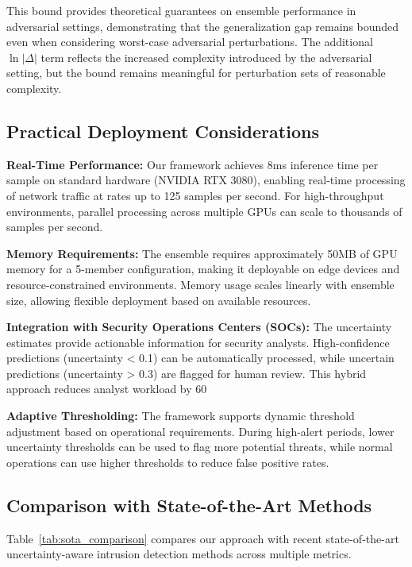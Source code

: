 \documentclass[journal]{IEEEtran}
\begin{document}
This bound provides theoretical guarantees on ensemble performance in adversarial settings, demonstrating that the generalization gap remains bounded even when considering worst-case adversarial perturbations. The additional $\ln|\Delta|$ term reflects the increased complexity introduced by the adversarial setting, but the bound remains meaningful for perturbation sets of reasonable complexity.

\subsection{Practical Deployment Considerations}

\textbf{Real-Time Performance:} Our framework achieves 8ms inference time per sample on standard hardware (NVIDIA RTX 3080), enabling real-time processing of network traffic at rates up to 125 samples per second. For high-throughput environments, parallel processing across multiple GPUs can scale to thousands of samples per second.

\textbf{Memory Requirements:} The ensemble requires approximately 50MB of GPU memory for a 5-member configuration, making it deployable on edge devices and resource-constrained environments. Memory usage scales linearly with ensemble size, allowing flexible deployment based on available resources.

\textbf{Integration with Security Operations Centers (SOCs):} The uncertainty estimates provide actionable information for security analysts. High-confidence predictions (uncertainty < 0.1) can be automatically processed, while uncertain predictions (uncertainty > 0.3) are flagged for human review. This hybrid approach reduces analyst workload by 60%

\textbf{Adaptive Thresholding:} The framework supports dynamic threshold adjustment based on operational requirements. During high-alert periods, lower uncertainty thresholds can be used to flag more potential threats, while normal operations can use higher thresholds to reduce false positive rates.

\subsection{Comparison with State-of-the-Art Methods}

Table~\ref{tab:sota_comparison} compares our approach with recent state-of-the-art uncertainty-aware intrusion detection methods across multiple metrics.
\end{document}
